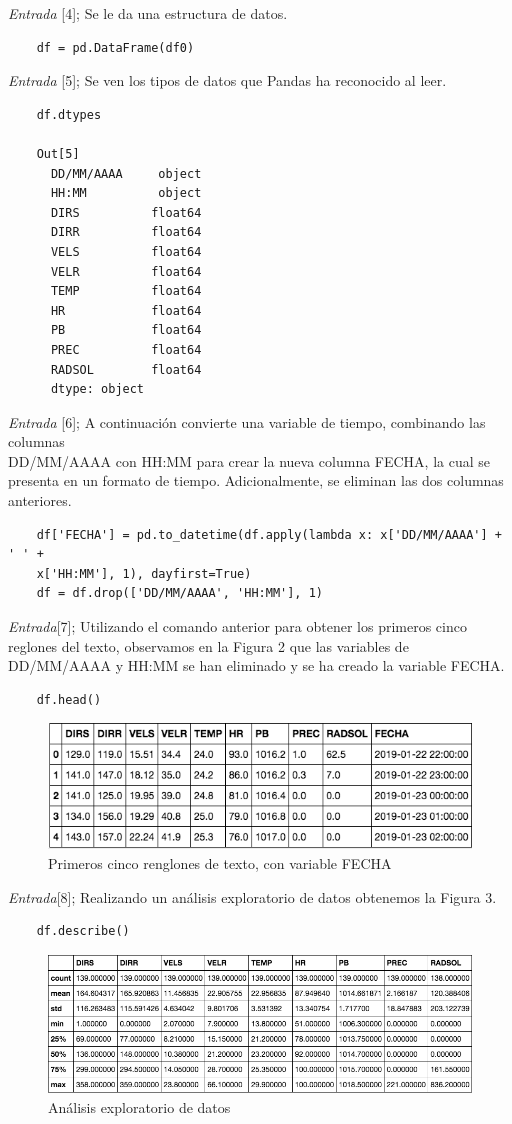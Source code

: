 \documentclass[11pt, spanish]{report}
\begin{document}
\emph{Entrada} [4]; Se le da una estructura de datos.  
\begin{verbatim}
    df = pd.DataFrame(df0)
\end{verbatim}
\emph{Entrada} [5]; Se ven los tipos de datos que Pandas ha reconocido al leer.  
\begin{verbatim}
    df.dtypes

    Out[5]
      DD/MM/AAAA     object
      HH:MM          object
      DIRS          float64
      DIRR          float64
      VELS          float64
      VELR          float64
      TEMP          float64
      HR            float64
      PB            float64
      PREC          float64
      RADSOL        float64
      dtype: object
\end{verbatim}
\emph{Entrada} [6]; A continuación convierte una variable de tiempo, combinando las columnas \\ DD/MM/AAAA con HH:MM para crear la nueva columna FECHA, la cual se presenta en un formato de tiempo. Adicionalmente, se eliminan las dos columnas anteriores.
\begin{verbatim}
    df['FECHA'] = pd.to_datetime(df.apply(lambda x: x['DD/MM/AAAA'] + ' ' + 
    x['HH:MM'], 1), dayfirst=True)
    df = df.drop(['DD/MM/AAAA', 'HH:MM'], 1)
\end{verbatim}

\emph{Entrada}[7]; Utilizando el comando anterior para obtener los primeros cinco reglones del texto, observamos en la Figura 2 que las variables de DD/MM/AAAA y HH:MM se han eliminado y se ha creado la variable FECHA.
\begin{verbatim}
    df.head()
\end{verbatim}
\begin{figure}[h]
\caption{Primeros cinco renglones de texto, con variable FECHA}
\centering
\includegraphics[width=\textwidth]{primero5x.png}
\end{figure}

\emph{Entrada}[8]; Realizando un análisis exploratorio de datos obtenemos la Figura 3.
\begin{verbatim}
    df.describe()
\end{verbatim}
\begin{figure}[h]
\caption{Análisis exploratorio de datos}
\centering
\includegraphics[width=\textwidth]{datos.png}
\end{figure}
\end{document}
